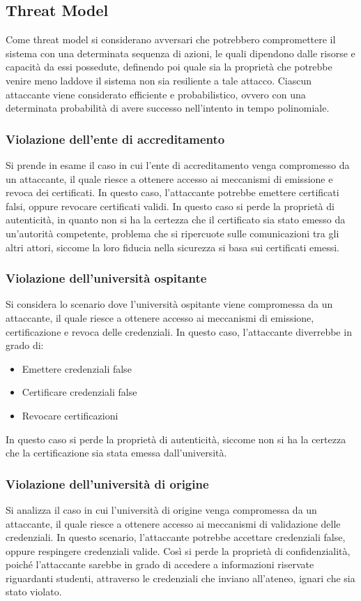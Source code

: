 \documentclass[a4paper,12pt]{article}
\begin{document}
\subsection{Threat Model}
Come threat model si considerano avversari che potrebbero compromettere il sistema con una determinata sequenza di azioni, le quali dipendono dalle risorse e capacità da essi possedute, definendo poi quale sia la proprietà che potrebbe venire meno laddove il sistema non sia resiliente a tale attacco.
\newline Ciascun attaccante viene considerato efficiente e probabilistico, ovvero con una determinata probabilità di avere successo nell'intento in tempo polinomiale.
\subsubsection{Violazione dell'ente di accreditamento}
Si prende in esame il caso in cui l'ente di accreditamento venga compromesso da un attaccante, il quale riesce a ottenere accesso ai meccanismi di emissione e revoca dei certificati. In questo caso, l'attaccante potrebbe emettere certificati falsi, oppure revocare certificati validi.
\newline In questo caso si perde la proprietà di autenticità, in quanto non si ha la certezza che il certificato sia stato emesso da un'autorità competente, problema che si ripercuote sulle comunicazioni tra gli altri attori, siccome la loro fiducia nella sicurezza si basa sui certificati emessi.
\subsubsection{Violazione dell'università ospitante}
Si considera lo scenario dove l'università ospitante viene compromessa da un attaccante, il quale riesce a ottenere accesso ai meccanismi di emissione, certificazione e revoca delle credenziali. In questo caso, l'attaccante diverrebbe in grado di:
\begin{itemize}
    \item Emettere credenziali false
    \item Certificare credenziali false
    \item Revocare certificazioni
\end{itemize}
In questo caso si perde la proprietà di autenticità, siccome non si ha la certezza che la certificazione sia stata emessa dall'università.
\subsubsection{Violazione dell'università di origine}
Si analizza il caso in cui l'università di origine venga compromessa da un attaccante, il quale riesce a ottenere accesso ai meccanismi di validazione delle credenziali. In questo scenario, l'attaccante potrebbe accettare credenziali false, oppure respingere credenziali valide.
\newline Così si perde la proprietà di confidenzialità, poiché l'attaccante sarebbe in grado di accedere a informazioni riservate riguardanti studenti, attraverso le credenziali che inviano all'ateneo, ignari che sia stato violato.
\end{document}

